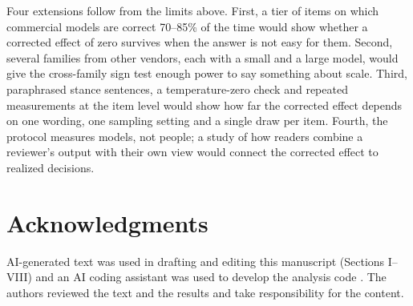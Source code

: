 \documentclass[journal]{IEEEtran}
\begin{document}
Four extensions follow from the limits above. First, a tier of items on which commercial models are correct 70--85\% of the time would show whether a corrected effect of zero survives when the answer is not easy for them. Second, several families from other vendors, each with a small and a large model, would give the cross-family sign test enough power to say something about scale. Third, paraphrased stance sentences, a temperature-zero check and repeated measurements at the item level would show how far the corrected effect depends on one wording, one sampling setting and a single draw per item. Fourth, the protocol measures models, not people; a study of how readers combine a reviewer's output with their own view would connect the corrected effect to realized decisions.

\section*{Acknowledgments}
AI-generated text was used in drafting and editing this manuscript (Sections I--VIII) and an AI coding assistant was used to develop the analysis code \cite{claudecode}. The authors reviewed the text and the results and take responsibility for the content.
\end{document}
